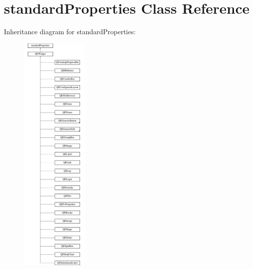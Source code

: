 \hypertarget{classstandardProperties}{
\section{standardProperties Class Reference}
\label{classstandardProperties}
}
Inheritance diagram for standardProperties:\begin{figure}[H]
\begin{center}
\leavevmode
\includegraphics[height=12.000000cm]{classstandardProperties}
\end{center}
\end{figure}
